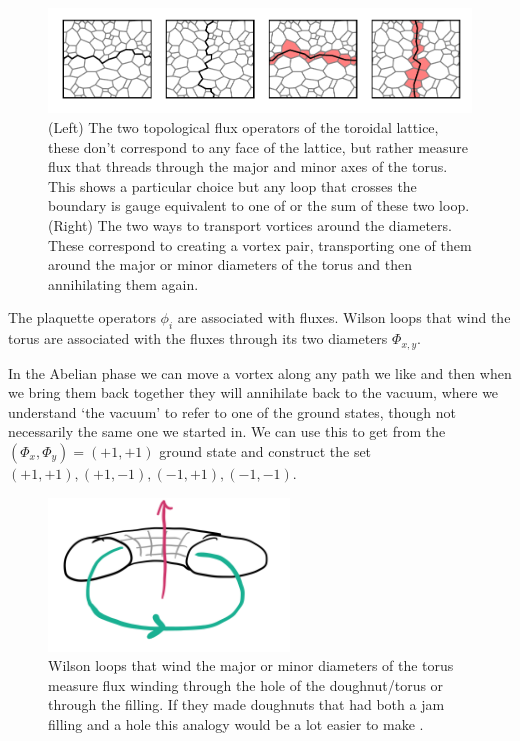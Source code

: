 \begin{figure}
\hypertarget{fig:loops_and_dual_loops}{%
\centering
\includegraphics[width=1.14\textwidth,height=\textheight]{figure_code/amk_chapter/loops_and_dual_loops/loops_and_dual_loops.pdf}
\caption{(Left) The two topological flux operators of the toroidal lattice, these don't correspond to any face of the lattice, but rather measure flux that threads through the major and minor axes of the torus. This shows a particular choice but any loop that crosses the boundary is gauge equivalent to one of or the sum of these two loop. (Right) The two ways to transport vortices around the diameters. These correspond to creating a vortex pair, transporting one of them around the major or minor diameters of the torus and then annihilating them again.}\label{fig:loops_and_dual_loops}
}
\end{figure}

The plaquette operators \(\phi_i\) are associated with fluxes. Wilson loops that wind the torus are associated with the fluxes through its two diameters \(\mathcal{\Phi}_{x,y}\).

In the Abelian phase we can move a vortex along any path we like and then when we bring them back together they will annihilate back to the vacuum, where we understand `the vacuum' to refer to one of the ground states, though not necessarily the same one we started in. We can use this to get from the \((\Phi_x, \Phi_y) = (+1, +1)\) ground state and construct the set \((+1, +1), (+1, -1), (-1, +1), (-1, -1)\).

\begin{figure}
\hypertarget{fig:topological_fluxes}{%
\centering
\includegraphics[width=0.57\textwidth,height=\textheight]{figure_code/amk_chapter/topological_fluxes.png}
\caption{Wilson loops that wind the major or minor diameters of the torus measure flux winding through the hole of the doughnut/torus or through the filling. If they made doughnuts that had both a jam filling and a hole this analogy would be a lot easier to make \textcite{parkerWhyDoesThis}.}\label{fig:topological_fluxes}
}
\end{figure}

